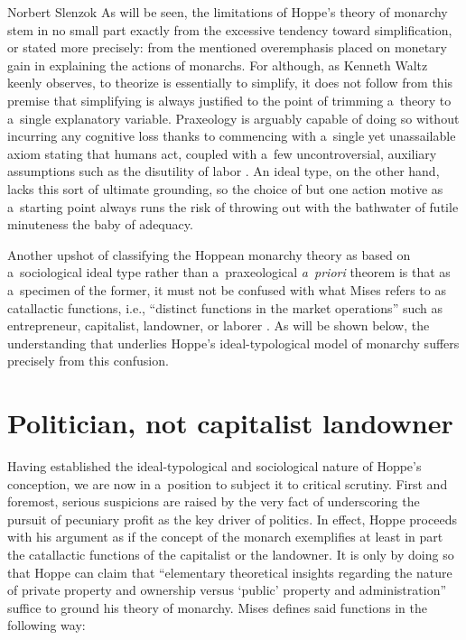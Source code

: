 \begin{artengenv}{Norbert Slenzok}
As will be seen, the limitations of Hoppe's theory of monarchy stem in no small part exactly from the excessive tendency toward simplification, or stated more precisely: from the mentioned overemphasis placed on monetary gain in explaining the actions of monarchs. For although, as Kenneth Waltz 
\parencite*[][chap. 1]{waltz_theory_1979} %
 keenly observes, to theorize is essentially to simplify, it does not follow from this premise that simplifying is always justified to the point of trimming a~theory to a~single explanatory variable. Praxeology is arguably capable of doing so without incurring any cognitive loss thanks to commencing with a~single yet unassailable axiom stating that humans act, coupled with a~few uncontroversial, auxiliary assumptions such as the disutility of labor 
\parencite[][chap. 1]{rothbard_man_2009}. %
 An ideal type, on the other hand, lacks this sort of ultimate grounding, so the choice of but one action motive as a~starting point always runs the risk of throwing out with the bathwater of futile minuteness the baby of adequacy.



Another upshot of classifying the Hoppean monarchy theory as based on a~sociological ideal type rather than a~praxeological \textit{a~priori} theorem is that as a~specimen of the former, it must not be confused with what Mises refers to as catallactic functions, i.e., ``distinct functions in the market operations'' such as entrepreneur, capitalist, landowner, or laborer 
\parencite[][p.252]{mises_human_1998}. %
 As will be shown below, the understanding that underlies Hoppe's ideal-typological model of monarchy suffers precisely from this confusion.



\section{Politician, not capitalist landowner}

Having established the ideal-typological and sociological nature of Hoppe's conception, we are now in a~position to subject it to critical scrutiny. First and foremost, serious suspicions are raised by the very fact of underscoring the pursuit of pecuniary profit as the key driver of politics. In effect, Hoppe proceeds with his argument as if the concept of the monarch exemplifies at least in part the catallactic functions of the\textcolor[rgb]{1.0,0.2,0.2}{ }capitalist or the landowner. It is only by doing so that Hoppe can claim that ``elementary theoretical insights regarding the nature of private property and ownership versus ‘public' property and administration'' suffice to ground his theory of monarchy. Mises 
\parencite*[][p.255]{mises_human_1998} %
 defines said functions in the following way:




\end{artengenv}
